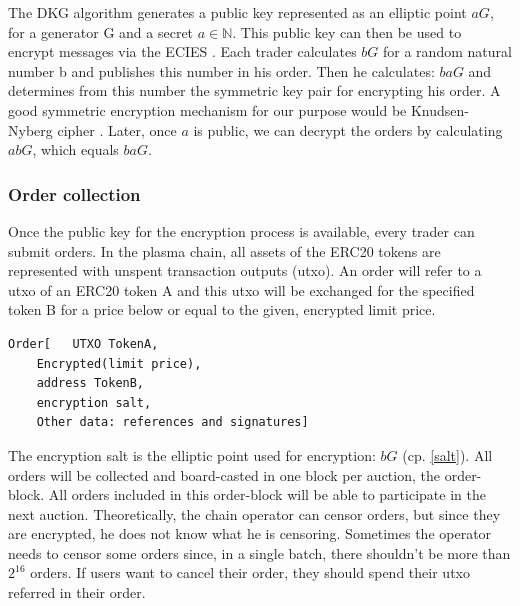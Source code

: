 \documentclass[11pt,parskip=full]{scrartcl}%
\begin{document}
The DKG algorithm generates a public key represented as an elliptic point $aG\label{public key}$, for a generator G and a secret $a\in \mathbb{N}$. This public key can then be used to encrypt messages via the ECIES \cite{ECIES}. Each trader calculates $bG \label{salt}$ for a random natural number b and publishes this number in his order. Then he calculates: $baG$ and determines from this number the symmetric key pair for encrypting his order. A good symmetric encryption mechanism for our purpose would be Knudsen-Nyberg cipher \cite{cipher}. Later, once $a$ is public, we can decrypt the orders by calculating $abG$, which equals $baG$.


\subsubsection{Order collection}
\label{orderblock}
Once the public key for the encryption process is available, every trader can submit orders. In the plasma chain, all assets of the ERC20 tokens are represented with unspent transaction outputs (utxo). An order will refer to a utxo of an ERC20 token A and this utxo will be exchanged for the specified token B for a price below or equal to the given, encrypted limit price.
\begin{lstlisting}
Order[   UTXO TokenA,
	Encrypted(limit price),
	address TokenB,
	encryption salt,
	Other data: references and signatures]
\end{lstlisting} 
The encryption salt is the elliptic point used for encryption:  $bG$ (cp. \ref{salt}).
All orders will be collected and board-casted in one block per auction, the order-block. All orders included in this order-block will be able to participate in the next auction. Theoretically, the chain operator can censor orders, but since they are encrypted, he does not know what he is censoring. Sometimes the operator needs to censor some orders since, in a single batch, there shouldn't be more than $2^{16}$ orders. \newline
If users want to cancel their order, they should spend their utxo referred in their order.
\end{document}
